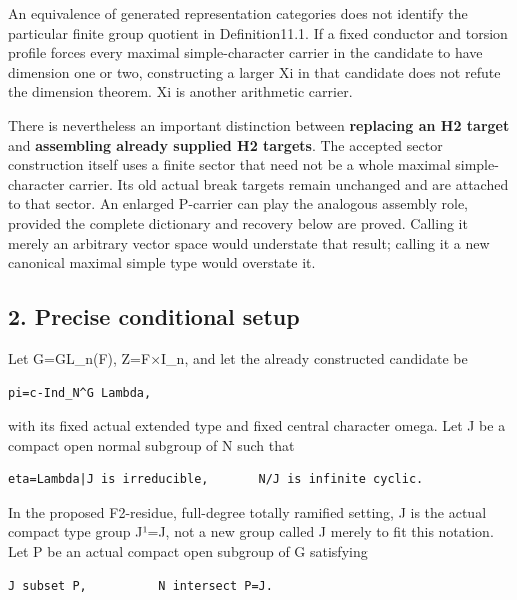An equivalence of generated representation categories does not identify
the particular finite group quotient in Definition11.1. If a fixed
conductor and torsion profile forces every maximal simple-character
carrier in the candidate to have dimension one or two, constructing a
larger Xi in that candidate does not refute the dimension theorem. Xi is
another arithmetic carrier.

There is nevertheless an important distinction between \textbf{replacing
an H2 target} and \textbf{assembling already supplied H2 targets}. The
accepted sector construction itself uses a finite sector that need not
be a whole maximal simple-character carrier. Its old actual break
targets remain unchanged and are attached to that sector. An enlarged
P-carrier can play the analogous assembly role, provided the complete
dictionary and recovery below are proved. Calling it merely an arbitrary
vector space would understate that result; calling it a new canonical
maximal simple type would overstate it.

\hypertarget{lowrank_contract-precise-conditional-setup}{%
\subsection{2. Precise conditional
setup}\label{lowrank_contract-precise-conditional-setup}}

Let G=GL\_n(F), Z=F×I\_n, and let the already constructed candidate be

\begin{Verbatim}[fontsize=\small,breaklines=true,breakanywhere=true]
pi=c-Ind_N^G Lambda,
\end{Verbatim}

with its fixed actual extended type and fixed central character omega.
Let J be a compact open normal subgroup of N such that

\begin{Verbatim}[fontsize=\small,breaklines=true,breakanywhere=true]
eta=Lambda|J is irreducible,       N/J is infinite cyclic.
\end{Verbatim}

In the proposed F2-residue, full-degree totally ramified setting, J is
the actual compact type group J¹=J, not a new group called J merely to
fit this notation. Let P be an actual compact open subgroup of G
satisfying

\begin{Verbatim}[fontsize=\small,breaklines=true,breakanywhere=true]
J subset P,          N intersect P=J.
\end{Verbatim}

